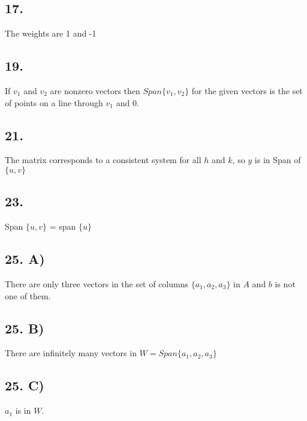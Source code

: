 \documentclass[12]{scrartcl}
\begin{document}
\subsection*{17.}
The weights are 1 and -1
\subsection*{19.}
If $v_1$ and $v_2$ are nonzero vectors then $Span \{v_1, v_2\}$ for the given vectors is the set of points on a line through $v_1$ and $0$.
\subsection*{21.}
The matrix corresponds to a consistent system for all $h$ and $k$, so $y$ is in Span of $\{u,v\}$
\subsection*{23.}
Span $\{u,v\}$ = span $\{u\}$
\subsection*{25. A)}
There are only three vectors in the set of columns $\{a_1, a_2, a_3\}$ in $A$ and $b$ is not one of them. 
\subsection*{25. B)}
There are infinitely many vectors in $W = Span \{a_1, a_2, a_3\}$
\subsection*{25. C)}
$a_1$ is in $W$.
\end{document}
